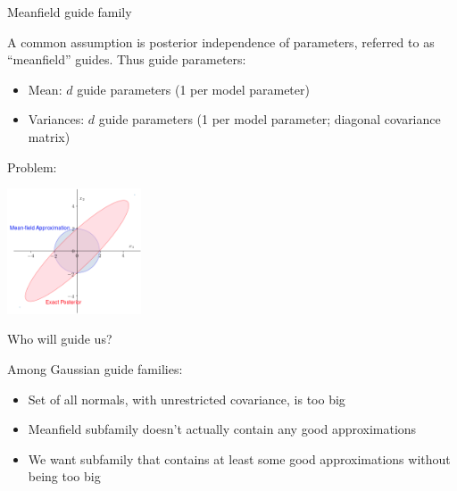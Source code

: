 \documentclass[
  ignorenonframetext,
]{beamer}
\providecommand{\tightlist}{%
  \setlength{\itemsep}{0pt}\setlength{\parskip}{0pt}}
\begin{document}
\begin{frame}{Meanfield guide family}
\protect\hypertarget{meanfield-guide-family}{}

A common assumption is posterior independence of parameters, referred to
as ``meanfield'' guides. Thus guide parameters:

\begin{itemize}
\tightlist
\item
  Mean: \(d\) guide parameters (1 per model parameter)
\item
  Variances: \(d\) guide parameters (1 per model parameter; diagonal
  covariance matrix)
\end{itemize}

Problem:

\begin{center}\includegraphics[width=150px]{meanfield_covar_figure} \end{center}

\end{frame}

\begin{frame}{Who will guide us?}
\protect\hypertarget{who-will-guide-us}{}

Among Gaussian guide families:

\begin{itemize}
\tightlist
\item
  Set of all normals, with unrestricted covariance, is too big
\item
  Meanfield subfamily doesn't actually contain any good approximations
\item
  We want subfamily that contains at least some good approximations
  without being too big
\end{itemize}

\end{frame}
\end{document}
